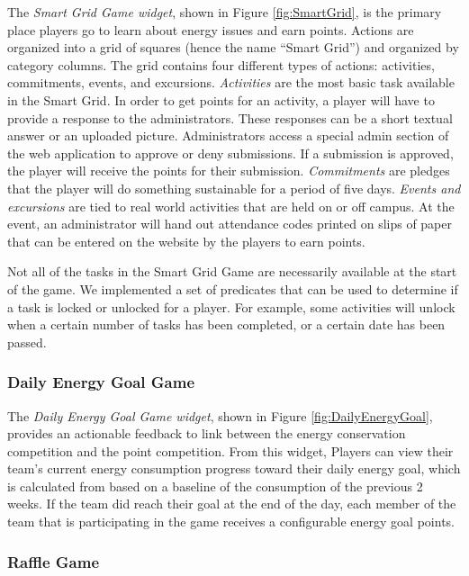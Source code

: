 \documentclass[11pt]{article}
\begin{document}
The {\em Smart Grid Game widget}, shown in Figure \ref{fig:SmartGrid}, is the primary place players go to learn about energy issues and earn points. Actions are organized into a grid of squares (hence the name ``Smart Grid'') and organized by category columns. The grid contains four different types of actions: activities, commitments, events, and excursions. {\em Activities} are the most basic task available in the Smart Grid. In order to get points for an activity, a player will have to provide a response to the administrators. These responses can be a short textual answer or an uploaded picture. Administrators access a special admin section of the web application to approve or deny submissions. If a submission is approved, the player will receive the points for their submission. {\em Commitments} are pledges that the player will do something sustainable for a period of five days. {\em Events and excursions} are tied to real world activities that are held on or off campus. At the event, an administrator will hand out attendance codes printed on slips of paper that can be entered on the website by the players to earn points.

Not all of the tasks in the Smart Grid Game are necessarily available at the start of the game. We implemented a set of predicates that can be used to determine if a task is locked or unlocked for a player. For example, some activities will unlock when a certain number of tasks has been completed, or a certain date has been passed.

\subsubsection{Daily Energy Goal Game}

The {\em Daily Energy Goal Game widget}, shown in Figure \ref{fig:DailyEnergyGoal}, provides an actionable feedback to link between the energy conservation competition and the point competition. From this widget, Players can view their team's current energy consumption progress toward their daily energy goal, which is calculated from based on a baseline of the consumption of the previous 2 weeks. If the team did reach their goal at the end of the day, each member of the team that is participating in the game receives a configurable energy goal points.

\subsubsection{Raffle Game}
\end{document}
